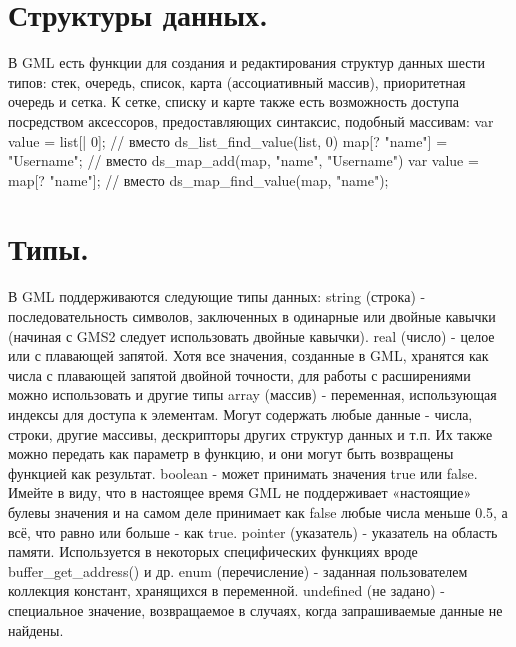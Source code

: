 \documentclass[14pt,article]{scrartcl}
\begin{document}
\section{Структуры данных.}
В GML есть функции для создания и редактирования структур данных шести типов: стек, очередь, список, карта (ассоциативный массив), приоритетная очередь и сетка. К сетке, списку и карте также есть возможность доступа посредством аксессоров, предоставляющих синтаксис, подобный массивам:
var value = list[| 0]; // вместо ds\_list\_find\_value(list, 0)
map[? "name"] = "Username"; // вместо ds\_map\_add(map, "name", "Username")
var value = map[? "name"]; // вместо ds\_map\_find\_value(map, "name");

\section{Типы.}
В GML поддерживаются следующие типы данных:
string (строка) - последовательность символов, заключенных в одинарные или двойные кавычки (начиная с GMS2 следует использовать двойные кавычки).
real (число) - целое или с плавающей запятой. Хотя все значения, созданные в GML, хранятся как числа с плавающей запятой двойной точности, для работы с расширениями можно использовать и другие типы
array (массив) - переменная, использующая индексы для доступа к элементам. Могут содержать любые данные - числа, строки, другие массивы, дескрипторы других структур данных и т.п. Их также можно передать как параметр в функцию, и они могут быть возвращены функцией как результат.
boolean - может принимать значения true или false. Имейте в виду, что в настоящее время GML не поддерживает «настоящие» булевы значения и на самом деле принимает как false любые числа меньше 0.5, а всё, что равно или больше - как true.
pointer (указатель) - указатель на область памяти. Используется в некоторых специфических функциях вроде buffer\_get\_address() и др.
enum (перечисление) - заданная пользователем коллекция констант, хранящихся в переменной.
undefined (не задано) - специальное значение, возвращаемое в случаях, когда запрашиваемые данные не найдены.
\end{document}
